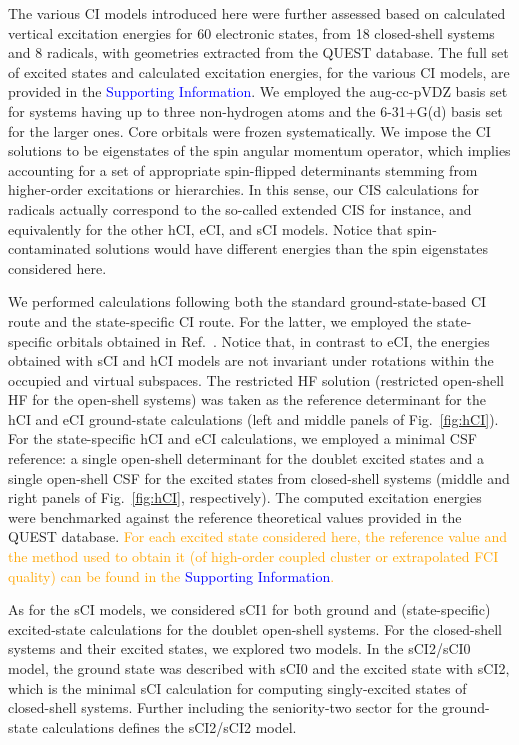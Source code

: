 \documentclass[aip,jcp,reprint,noshowkeys,superscriptaddress]{revtex4-1}
\newcommand{\fk}[1]{\textcolor{orange}{#1}}
\newcommand{\SupInf}{\textcolor{blue}{Supporting Information}}
\begin{document}
The various CI models introduced here were further assessed based on calculated vertical excitation energies for 60 electronic states,
from 18 closed-shell systems and 8 radicals, with geometries extracted from the QUEST database. \cite{Veril_2021}
The full set of excited states and calculated excitation energies, for the various CI models, are provided in the {\SupInf}.
We employed the aug-cc-pVDZ basis set for systems having up to three non-hydrogen atoms and the 6-31+G(d) basis set for the larger ones.
Core orbitals were frozen systematically.
We impose the CI solutions to be eigenstates of the spin angular momentum operator, which implies accounting for a set of appropriate spin-flipped determinants stemming from higher-order excitations or hierarchies. \cite{Chilkuri_2021}
In this sense, our CIS calculations for radicals actually correspond to the so-called extended CIS \cite{Maurice_1996} for instance, and equivalently for the other hCI, eCI, and sCI models.
Notice that spin-contaminated solutions would have different energies than the spin eigenstates considered here.

We performed calculations following both the standard ground-state-based CI route and the state-specific CI route. \cite{Kossoski_2023}
For the latter, we employed the state-specific orbitals obtained in Ref.~.
Notice that, in contrast to eCI, the energies obtained with sCI and hCI models are not invariant under rotations within the occupied and virtual subspaces.
The restricted HF solution (restricted open-shell HF for the open-shell systems) was taken as the reference determinant for the hCI and eCI ground-state calculations
(left and middle panels of Fig.~\ref{fig:hCI}).
For the state-specific hCI and eCI calculations, we employed a minimal CSF reference: \cite{Kossoski_2023}
a single open-shell determinant for the doublet excited states and a single open-shell CSF for the excited states from closed-shell systems
(middle and right panels of Fig.~\ref{fig:hCI}, respectively).
The computed excitation energies were benchmarked against the reference theoretical values provided in the QUEST database. \cite{Veril_2021}
\fk{For each excited state considered here, the reference value and the method used to obtain it (of high-order coupled cluster or extrapolated FCI quality) can be found in the {\SupInf}.}

As for the sCI models,
we considered sCI1 for both ground and (state-specific) excited-state calculations for the doublet open-shell systems.
For the closed-shell systems and their excited states, we explored two models.
In the sCI2/sCI0 model, the ground state was described with sCI0 and the excited state with sCI2, which is the minimal sCI calculation for computing singly-excited states of closed-shell systems.
Further including the seniority-two sector for the ground-state calculations defines the sCI2/sCI2 model.
\end{document}
